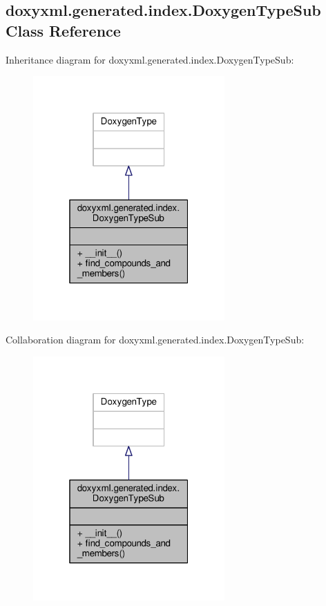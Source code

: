 \subsection{doxyxml.\+generated.\+index.\+Doxygen\+Type\+Sub Class Reference}
\label{classdoxyxml_1_1generated_1_1index_1_1DoxygenTypeSub}


Inheritance diagram for doxyxml.\+generated.\+index.\+Doxygen\+Type\+Sub\+:
\nopagebreak
\begin{figure}[H]
\begin{center}
\leavevmode
\includegraphics[width=208pt]{d7/d57/classdoxyxml_1_1generated_1_1index_1_1DoxygenTypeSub__inherit__graph}
\end{center}
\end{figure}


Collaboration diagram for doxyxml.\+generated.\+index.\+Doxygen\+Type\+Sub\+:
\nopagebreak
\begin{figure}[H]
\begin{center}
\leavevmode
\includegraphics[width=208pt]{d2/ddb/classdoxyxml_1_1generated_1_1index_1_1DoxygenTypeSub__coll__graph}
\end{center}
\end{figure}
